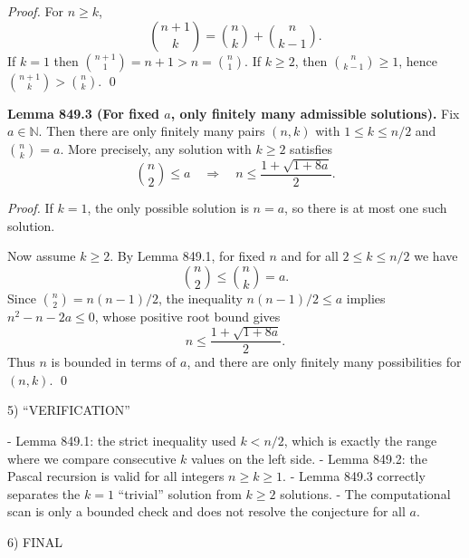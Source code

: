\emph{Proof.}
For $n\ge k$,
\[
\binom{n+1}{k}=\binom{n}{k}+\binom{n}{k-1}.
\]
If $k=1$ then $\binom{n+1}{1}=n+1>n=\binom{n}{1}$. If $k\ge 2$, then $\binom{n}{k-1}\ge 1$, hence $\binom{n+1}{k}>\binom{n}{k}$. \qed

\textbf{Lemma 849.3 (For fixed $a$, only finitely many admissible solutions).}
Fix $a\in\mathbb{N}$. Then there are only finitely many pairs $(n,k)$ with $1\le k\le n/2$ and $\binom{n}{k}=a$. More precisely, any solution with $k\ge 2$ satisfies
\[
\binom{n}{2}\le a \quad\Rightarrow\quad n\le \frac{1+\sqrt{1+8a}}{2}.
\]

\emph{Proof.}
If $k=1$, the only possible solution is $n=a$, so there is at most one such solution.

Now assume $k\ge 2$. By Lemma 849.1, for fixed $n$ and for all $2\le k\le n/2$ we have
\[
\binom{n}{2}\le \binom{n}{k}=a.
\]
Since $\binom{n}{2}=n(n-1)/2$, the inequality $n(n-1)/2\le a$ implies $n^2-n-2a\le 0$, whose positive root bound gives
\[
n\le \frac{1+\sqrt{1+8a}}{2}.
\]
Thus $n$ is bounded in terms of $a$, and there are only finitely many possibilities for $(n,k)$. \qed

5) “VERIFICATION”

- Lemma 849.1: the strict inequality used $k< n/2$, which is exactly the range where we compare consecutive $k$ values on the left side.
- Lemma 849.2: the Pascal recursion is valid for all integers $n\ge k\ge 1$.
- Lemma 849.3 correctly separates the $k=1$ “trivial” solution from $k\ge 2$ solutions.
- The computational scan is only a bounded check and does not resolve the conjecture for all $a$.

6) FINAL

